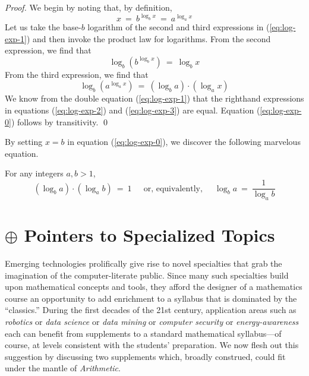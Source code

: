 \begin{proof}
We begin by noting that, by definition,
\begin{equation}
\label{eq:log-exp-1}
 x \ = \ b^{\log_b x} \ = \ a^{\log_a x}
\end{equation}
Let us take the base-$b$ logarithm of the second and third expressions
in (\ref{eq:log-exp-1}) and then invoke the product law for logarithms.
From the second expression, we find that
\begin{equation}
\label{eq:log-exp-2}
 \log_b \left(b^{\log_b x} \right) \ = \ \log_b x
\end{equation}
From the third expression, we find that
\begin{equation}
\label{eq:log-exp-3}
 \log_b \left( a^{\log_a x} \right) \ = \
\left(\log_b a \right) \cdot \left( \log_a x \right)
\end{equation}
We know from the double equation (\ref{eq:log-exp-1}) that the
righthand expressions in equations (\ref{eq:log-exp-2}) and
(\ref{eq:log-exp-3}) are equal.  Equation (\ref{eq:log-exp-0}) follows
by transitivity.  \qed
\end{proof}

\noindent
By setting $x = b$ in equation (\ref{eq:log-exp-0}), we discover the
following marvelous equation.

\begin{prop}
For any integers $a, b >1$,
\begin{equation}
\left(\log_b a \right) \cdot \left( \log_a b \right) \ = \ 1 \ \ \ \ \
\mbox{ or, equivalently, } \ \ \ \ \
\log_b a \ = \ \frac{1}{\log_a b} 
\end{equation}
\end{prop}


\section{$\oplus$ Pointers to Specialized Topics}

Emerging technologies prolifically give rise to novel specialties that
grab the imagination of the computer-literate public.  Since many such
specialties build upon mathematical concepts and tools, they afford
the designer of a mathematics course an opportunity to add enrichment
to a syllabus that is dominated by the ``classics.''  During the first
decades of the 21st century, application areas such as {\it robotics}
or {\it data science} or {\it data mining} or {\it computer security}
or {\it energy-awareness} each can benefit from supplements to a
standard mathematical syllabus---of course, at levels consistent with
the students' preparation.  We now flesh out this suggestion by
discussing two supplements which, broadly construed, could fit under
the mantle of {\it Arithmetic}.

